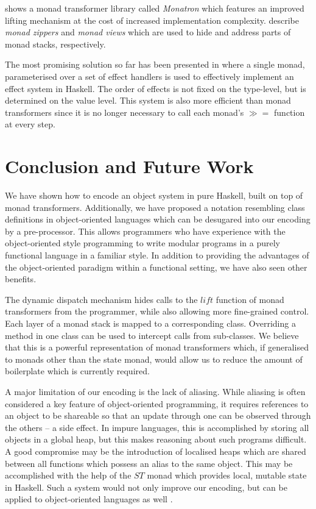 \documentclass[runningheads,a4paper]{llncs}
\begin{document}
\cite{jaskelioff2011monatron} shows a monad transformer library called \emph{Monatron} which features an improved lifting mechanism at the cost of increased implementation complexity. \cite{schrijvers2011monads} describe \emph{monad zippers} and \emph{monad views} which are used to hide and address parts of monad stacks, respectively.

The most promising solution so far has been presented in \cite{kiselyov2013extensible} where a single monad, parameterised over a set of effect handlers \cite{plotkin2009handlers} is used to effectively implement an effect system in Haskell. The order of effects is not fixed on the type-level, but is determined on the value level. This system is also more efficient than monad transformers since it is no longer necessary to call each monad's $\gg\!\!=$ function at every step. 

\section{Conclusion and Future Work}
\label{sec:conclusions}

We have shown how to encode an object system in pure Haskell, built on top of monad transformers. Additionally, we have proposed a notation resembling class definitions in object-oriented languages which can be desugared into our encoding by a pre-processor. This allows programmers who have experience with the object-oriented style programming to write modular programs in a purely functional language in a familiar style. In addition to providing the advantages of the object-oriented paradigm within a functional setting, we have also seen other benefits.

The dynamic dispatch mechanism hides calls to the $\mathit{lift}$ function of monad transformers from the programmer, while also allowing more fine-grained control. Each layer of a monad stack is mapped to a corresponding class. Overriding a method in one class can be used to intercept calls from sub-classes. We believe that this is a powerful representation of monad transformers which, if generalised to monads other than the state monad, would allow us to reduce the amount of boilerplate which is currently required.

A major limitation of our encoding is the lack of aliasing. While aliasing is often considered a key feature of object-oriented programming, it requires references to an object to be shareable so that an update through one can be observed through the others -- a side effect. In impure languages, this is accomplished by storing all objects in a global heap, but this makes reasoning about such programs difficult. A good compromise may be the introduction of localised heaps which are shared between all functions which possess an alias to the same object. This may be accomplished with the help of the $\mathit{ST}$ monad \cite{launchbury1995state} which provides local, mutable state in Haskell. Such a system would not only improve our encoding, but can be applied to object-oriented languages as well \cite{hogg1992geneva}.  
\end{document}
